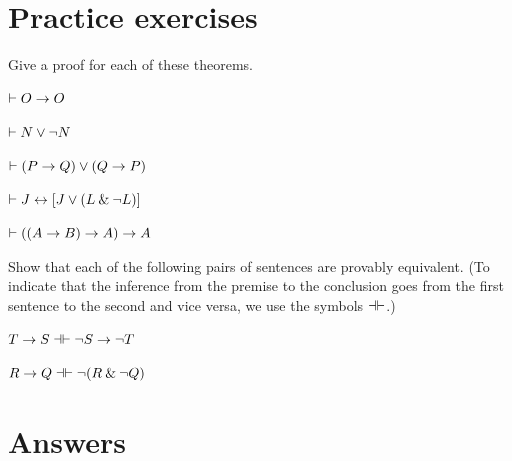 

\section{Practice exercises}
\setcounter{ProbPart}{0}


\problempart
Give a proof for each of these theorems.
\begin{earg}
\item $\vdash O \rightarrow O$\smallskip
\item $\vdash N \vee {\neg} N$\smallskip
\item $\vdash (P \rightarrow Q) \vee (Q \rightarrow P)$\smallskip
\item $\vdash J \leftrightarrow [J\vee (L\mathbin{\&}{\neg} L)]$\smallskip
\item $\vdash ((A \rightarrow B) \rightarrow A) \rightarrow A$\smallskip 
\end{earg}


\problempart
Show that each of the following pairs of sentences are provably equivalent. (To indicate that the inference from the premise to the conclusion goes from the first sentence to the second and vice versa, we use the symbols $\dashv\vdash$.)
\begin{earg}
\item $T\rightarrow S \dashv\vdash {\neg} S \rightarrow {\neg} T$
\item $R \rightarrow Q \dashv\vdash {\neg}(R \mathbin{\&} {\neg} Q)$
\end{earg}



\section{Answers}
\setcounter{ProbPart}{0}


